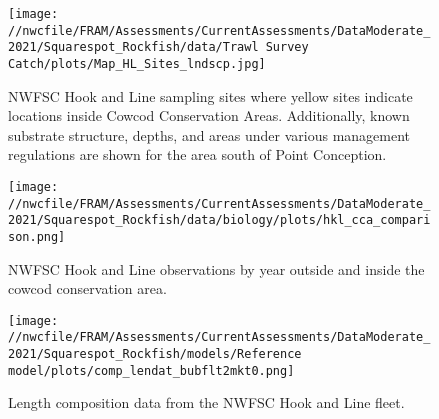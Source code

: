 \documentclass[11pt,
  english,
  a4paper,
]{article}
\begin{document}
\tagmcend\tagstructend


\begin{figure}
\centering
\texttt{[image: //nwcfile/FRAM/Assessments/CurrentAssessments/DataModerate\_2021/Squarespot\_Rockfish/data/Trawl Survey Catch/plots/Map\_HL\_Sites\_lndscp.jpg]}
\caption{NWFSC Hook and Line sampling sites where yellow sites indicate locations inside Cowcod Conservation Areas. Additionally, known substrate structure, depths, and areas under various management regulations are shown for the area south of Point Conception.\label{fig:hkl-sites}}
\end{figure}

\tagmcend\tagstructend


\begin{figure}
\centering
\texttt{[image: //nwcfile/FRAM/Assessments/CurrentAssessments/DataModerate\_2021/Squarespot\_Rockfish/data/biology/plots/hkl\_cca\_comparison.png]}
\caption{NWFSC Hook and Line observations by year outside and inside the cowcod conservation area.\label{fig:hkl-cca}}
\end{figure}

\tagmcend\tagstructend


\begin{figure}
\centering
\texttt{[image: //nwcfile/FRAM/Assessments/CurrentAssessments/DataModerate\_2021/Squarespot\_Rockfish/models/Reference model/plots/comp\_lendat\_bubflt2mkt0.png]}
\caption{Length composition data from the NWFSC Hook and Line fleet.\label{fig:hkl-len-data}}
\end{figure}

\tagmcend\tagstructend

\end{document}
